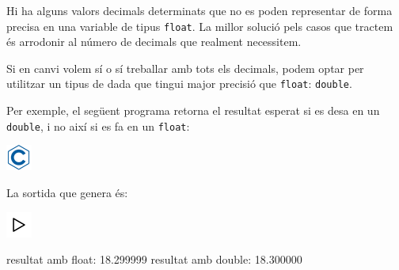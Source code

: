 \documentclass[]{book}
\newenvironment{Shaded}{\begin{snugshade}}{\end{snugshade}}
\newcommand{\DataTypeTok}[1]{\textcolor[rgb]{0.13,0.29,0.53}{#1}}
\newcommand{\DecValTok}[1]{\textcolor[rgb]{0.00,0.00,0.81}{#1}}
\newcommand{\FloatTok}[1]{\textcolor[rgb]{0.00,0.00,0.81}{#1}}
\newcommand{\SpecialCharTok}[1]{\textcolor[rgb]{0.00,0.00,0.00}{#1}}
\newcommand{\StringTok}[1]{\textcolor[rgb]{0.31,0.60,0.02}{#1}}
\newcommand{\ImportTok}[1]{#1}
\newcommand{\ControlFlowTok}[1]{\textcolor[rgb]{0.13,0.29,0.53}{\textbf{#1}}}
\newcommand{\PreprocessorTok}[1]{\textcolor[rgb]{0.56,0.35,0.01}{\textit{#1}}}
\newcommand{\NormalTok}[1]{#1}
\begin{document}
Hi ha alguns valors decimals determinats que no es poden representar de
forma precisa en una variable de tipus \texttt{float}. La millor solució
pels casos que tractem és arrodonir al número de decimals que realment
necessitem.

Si en canvi volem sí o sí treballar amb tots els decimals, podem optar
per utilitzar un tipus de dada que tingui major precisió que
\texttt{float}: \texttt{double}.

Per exemple, el següent programa retorna el resultat esperat si es desa
en un \texttt{double}, i no així si es fa en un \texttt{float}:

\includegraphics{./img/c.png}

\begin{Shaded}
\end{Shaded}

La sortida que genera és:

\includegraphics{./img/play.png}

\begin{Shaded}
\begin{Highlighting}[]
\NormalTok{resultat amb  }\DataTypeTok{float}\NormalTok{: }\FloatTok{18.299999}
\NormalTok{resultat amb }\DataTypeTok{double}\NormalTok{: }\FloatTok{18.300000}
\end{Highlighting}
\end{Shaded}
\end{document}
